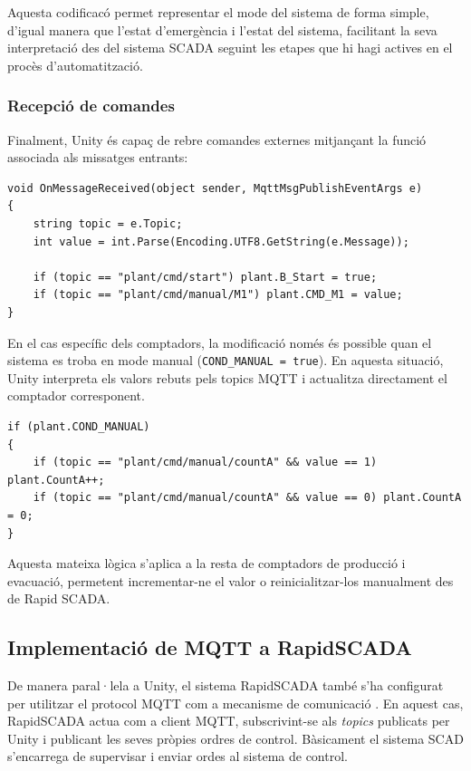 \documentclass[a4paper,11pt,DIV=13,headings=normal,abstract=true,twoside=semi]{article}
\begin{document}
Aquesta codificacó permet representar el mode del sistema de forma simple, d'igual manera que l'estat d'emergència i l'estat del sistema, facilitant la seva interpretació des del sistema SCADA seguint les etapes que hi hagi actives en el procès d'automatització.

\subsubsection{Recepció de comandes}

Finalment, Unity és capaç de rebre comandes externes mitjançant la funció associada als missatges entrants:

\begin{lstlisting}[style=simple]
void OnMessageReceived(object sender, MqttMsgPublishEventArgs e)
{
    string topic = e.Topic;
    int value = int.Parse(Encoding.UTF8.GetString(e.Message));

    if (topic == "plant/cmd/start") plant.B_Start = true;
    if (topic == "plant/cmd/manual/M1") plant.CMD_M1 = value;
}
\end{lstlisting}



En el cas específic dels comptadors, la modificació només és possible quan el sistema es troba en mode manual (\texttt{COND\_MANUAL = true}). En aquesta situació, Unity interpreta els valors rebuts pels topics MQTT i actualitza directament el comptador corresponent.

\begin{lstlisting}[style=simple]
if (plant.COND_MANUAL)
{
    if (topic == "plant/cmd/manual/countA" && value == 1) plant.CountA++;
    if (topic == "plant/cmd/manual/countA" && value == 0) plant.CountA = 0;
}
\end{lstlisting}

Aquesta mateixa lògica s'aplica a la resta de comptadors de producció i evacuació, permetent incrementar-ne el valor o reinicialitzar-los manualment des de Rapid SCADA. 


\subsection{Implementació de MQTT a RapidSCADA}

De manera paral·lela a Unity, el sistema RapidSCADA també s'ha configurat per utilitzar el protocol MQTT com a mecanisme de comunicació \cite{RapidScadaVideos}. En aquest cas, RapidSCADA actua com a client MQTT, subscrivint-se als \textit{topics} publicats per Unity i publicant les seves pròpies ordres de control. Bàsicament el sistema SCAD s'encarrega de supervisar i enviar ordes al sistema de control. 
\end{document}
